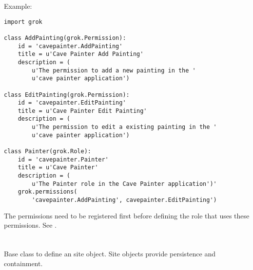   \begin{bf}Example:\end{bf}

  \begin{verbatim}
import grok

class AddPainting(grok.Permission):
    id = 'cavepainter.AddPainting'
    title = u'Cave Painter Add Painting'
    description = (
        u'The permission to add a new painting in the '
        u'cave painter application')

class EditPainting(grok.Permission):
    id = 'cavepainter.EditPainting'
    title = u'Cave Painter Edit Painting'
    description = (
        u'The permission to edit a existing painting in the '
        u'cave painter application')

class Painter(grok.Role):
    id = 'cavepainter.Painter'
    title = u'Cave Painter'
    description = (
        u'The Painter role in the Cave Painter application')'
    grok.permissions(
        'cavepainter.AddPainting', cavepainter.EditPainting')

  \end{verbatim}

  \begin{seealso}
  The permissions need to be registered first before defining the role that uses these permissions. See .
  \end{seealso}

\section{}

  Base class to define an site object. Site objects provide persistence and
  containment.

\section{}

\section{}

\section{}
